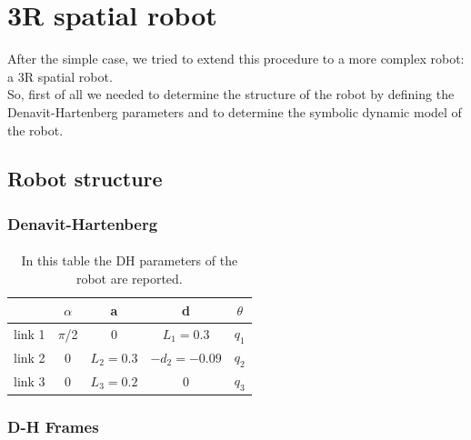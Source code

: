 \documentclass{article}
\begin{document}
\pagebreak

\section{3R spatial robot}
After the simple case, we tried to extend this procedure to a more complex robot: a 3R spatial robot.\\
So, first of all we needed to determine the structure of the robot by defining the Denavit-Hartenberg parameters and to determine the symbolic dynamic model of the robot.
\subsection{Robot structure}
\subsubsection*{Denavit-Hartenberg}
\paragraph{}
\FloatBarrier
\begin{table}[!htbp]
\centering
\begin{tabular}{|c|cccc|}
\hline
& $\alpha$ & a & d & $\theta$\\
\hline
link 1 & $\pi$/2 & 0 & $L_1=0.3$ & $q_1$\\
link 2 & 0 & $L_2=0.3$ & $-d_2=-0.09$ & $q_2$\\
link 3 & 0 & $L_3=0.2$ & 0 & $q_3$\\
\hline
\end{tabular}
\caption{In this table the DH parameters of the robot are reported.}
\end{table}
\subsubsection*{D-H Frames}
\end{document}
